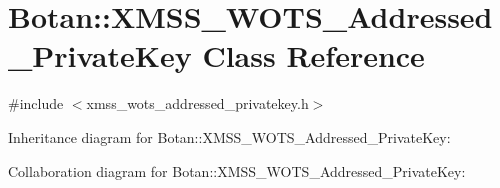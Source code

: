 \hypertarget{class_botan_1_1_x_m_s_s___w_o_t_s___addressed___private_key}{}\section{Botan\+:\+:X\+M\+S\+S\+\_\+\+W\+O\+T\+S\+\_\+\+Addressed\+\_\+\+Private\+Key Class Reference}
\label{class_botan_1_1_x_m_s_s___w_o_t_s___addressed___private_key}


{\ttfamily \#include $<$xmss\+\_\+wots\+\_\+addressed\+\_\+privatekey.\+h$>$}



Inheritance diagram for Botan\+:\+:X\+M\+S\+S\+\_\+\+W\+O\+T\+S\+\_\+\+Addressed\+\_\+\+Private\+Key\+:


Collaboration diagram for Botan\+:\+:X\+M\+S\+S\+\_\+\+W\+O\+T\+S\+\_\+\+Addressed\+\_\+\+Private\+Key\+:
